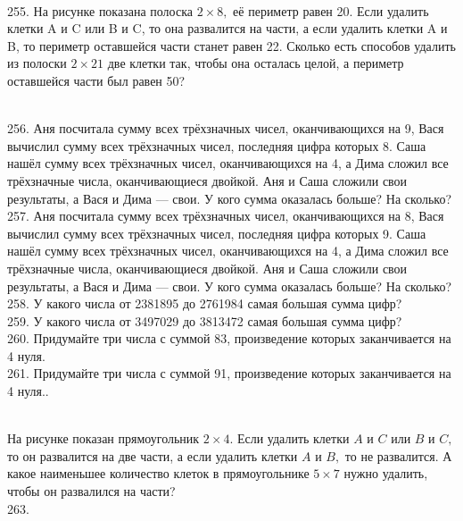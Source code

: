 \begin{figure}[ht!]
\end{figure}\\
255. На рисунке показана полоска $2\times 8,$ её периметр равен 20. Если удалить клетки A и C или B и C, то она развалится на части, а если удалить клетки A и B, то периметр оставшейся части станет равен 22. Сколько есть способов удалить из полоски $2\times 21$ две клетки так, чтобы она осталась целой, а периметр оставшейся части был равен 50?
\begin{figure}[ht!]
\end{figure}\\
256. Аня посчитала сумму всех трёхзначных чисел, оканчивающихся на 9, Вася вычислил сумму всех трёхзначных чисел, последняя цифра которых 8. Саша нашёл сумму всех трёхзначных чисел, оканчивающихся на 4, а Дима сложил все трёхзначные числа, оканчивающиеся двойкой. Аня и Саша сложили свои результаты, а Вася и Дима --- свои. У кого сумма оказалась больше? На сколько?\\
257. Аня посчитала сумму всех трёхзначных чисел, оканчивающихся на 8, Вася вычислил сумму всех трёхзначных чисел, последняя цифра которых 9. Саша нашёл сумму всех трёхзначных чисел, оканчивающихся на 4, а Дима сложил все трёхзначные числа, оканчивающиеся двойкой. Аня и Саша сложили свои результаты, а Вася и Дима --- свои. У кого сумма оказалась больше? На сколько?\\
258. У какого числа от 2381895 до 2761984 самая большая сумма цифр?\\
259. У какого числа от 3497029 до 3813472 самая большая сумма цифр?\\
260. Придумайте три числа с суммой 83, произведение которых заканчивается на 4 нуля.\\
261. Придумайте три числа с суммой 91, произведение которых заканчивается на 4 нуля.\newpage{}. \begin{figure}[ht!]
\end{figure}\\
На рисунке показан прямоугольник $2\times4.$ Если удалить клетки $A$ и $C$ или $B$ и $C,$ то он развалится на две части, а если удалить клетки $A$ и $B,$ то не развалится. А какое наименьшее количество клеток в прямоугольнике $5\times7$ нужно удалить, чтобы он развалился на части?\\
263. \begin{figure}[ht!]
\end{figure}\\
